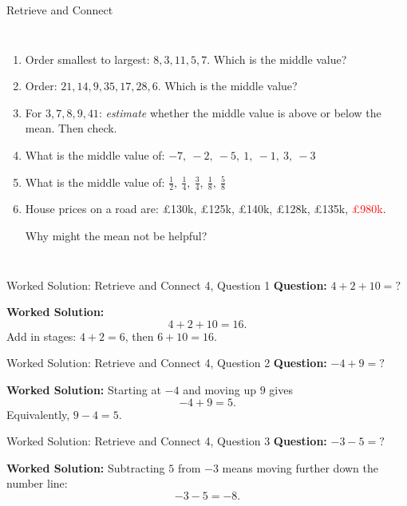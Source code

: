 \documentclass{beamer}
\newcommand{\ashow}[1]{\uncover<2->{\textcolor{red}{\small #1}}}
\begin{document}
\begin{frame}{Retrieve and Connect}
\begin{columns}[T]
\begin{enumerate}\itemsep1pt
\setcounter{enumi}{4}

  \item Order smallest to largest:
  $8,3,11,5,7$.
  Which is the middle value? \ashow{7}

  \item Order:
  $21,14,9,35,17,28,6$.
  Which is the middle value? \ashow{17}

  \item For $3,7,8,9,41$:
  \textit{estimate} whether the middle value is above or below the mean.
  Then check. \ashow{below: median $8$, mean $13.6$}

  \item What is the middle value of:
  $-7,\ -2,\ -5,\ 1,\ -1,\ 3,\ -3$ \ashow{$-2$}

  \item What is the middle value of:
  $\tfrac{1}{2},\ \tfrac{1}{4},\ \tfrac{3}{4},\ \tfrac{1}{8},\ \tfrac{5}{8}$ \ashow{$\frac{1}{2}$}

  \item House prices on a road are:
  \pounds130k,
  \pounds125k,
  \pounds140k,
  \pounds128k,
  \pounds135k,
  \textcolor{red}{\pounds980k}.

  Why might the mean not be helpful? \ashow{the \pounds980k outlier pulls the mean up}

\end{enumerate}

\end{columns}

\end{frame}

\begin{frame}{Worked Solution: Retrieve and Connect 4, Question 1}
\hypertarget{work-st4}{}
\textbf{Question:} \(4 + 2 + 10 = ?\)

\textbf{Worked Solution:}
\[
4 + 2 + 10 = 16.
\]
Add in stages: \(4 + 2 = 6\), then \(6 + 10 = 16\).
\end{frame}

\begin{frame}{Worked Solution: Retrieve and Connect 4, Question 2}
\textbf{Question:} \(-4 + 9 = ?\)

\textbf{Worked Solution:}
Starting at \(-4\) and moving up \(9\) gives
\[
-4 + 9 = 5.
\]
Equivalently, \(9 - 4 = 5\).
\end{frame}

\begin{frame}{Worked Solution: Retrieve and Connect 4, Question 3}
\textbf{Question:} \(-3 - 5 = ?\)

\textbf{Worked Solution:}
Subtracting \(5\) from \(-3\) means moving further down the number line:
\[
-3 - 5 = -8.
\]
\end{frame}
\end{document}
